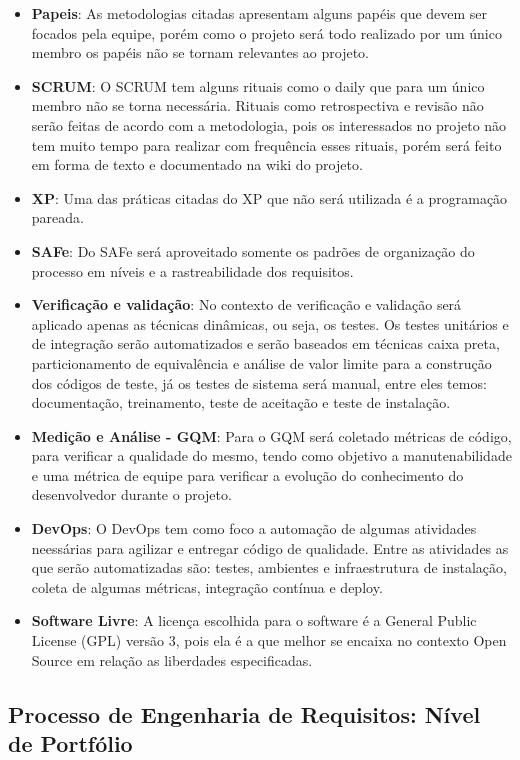 \begin{itemize}
  \item \textbf{Papeis}: As metodologias citadas apresentam alguns papéis que devem ser focados pela equipe, porém como o projeto será todo realizado por um único membro os papéis não se tornam relevantes ao projeto.
  \item \textbf{SCRUM}: O SCRUM tem alguns rituais como o daily que para um único membro não se torna necessária.  Rituais como retrospectiva e revisão não serão feitas de acordo com a metodologia, pois os interessados no projeto não tem muito tempo para realizar com frequência esses rituais, porém será feito em forma de texto e documentado na wiki do projeto.
  \item \textbf{XP}: Uma das práticas citadas do XP que não será utilizada é a programação pareada.
  \item \textbf{SAFe}: Do SAFe será aproveitado somente os padrões de organização do processo em níveis e a rastreabilidade dos requisitos.
  \item \textbf{Verificação e validação}: No contexto de verificação e validação será aplicado apenas as técnicas dinâmicas, ou seja, os testes. Os testes unitários e de integração serão automatizados e serão baseados em técnicas caixa preta, particionamento de equivalência e análise de valor limite para a construção dos códigos de teste, já os testes de sistema será manual, entre eles temos: documentação, treinamento, teste de aceitação e teste de instalação.
  \item \textbf{Medição e Análise - GQM}: Para o GQM será coletado métricas de código, para verificar a qualidade do mesmo, tendo como objetivo a manutenabilidade e uma métrica de equipe para verificar a evolução do conhecimento do desenvolvedor durante o projeto.
  \item \textbf{DevOps}: O DevOps tem como foco a automação de algumas atividades neessárias para agilizar e entregar código de qualidade. Entre as atividades as que serão automatizadas são: testes, ambientes e infraestrutura de instalação, coleta de algumas métricas, integração contínua e deploy.
  \item \textbf{Software Livre}: A licença escolhida para o software é a General Public License (GPL) versão 3, pois ela é a que melhor se encaixa no contexto Open Source em relação as liberdades especificadas.
\end{itemize}

\subsection{Processo de Engenharia de Requisitos: Nível de Portfólio}

